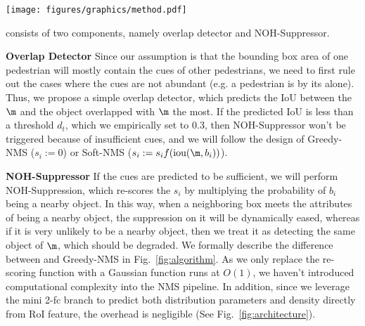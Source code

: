 \documentclass[sigconf]{acmart}
\begin{document}
\begin{figure*}[t]
\begin{center}
\texttt{[image: figures/graphics/method.pdf]}
\end{center}
\caption{\textbf{Architecture} {\normalfont The illustration of integrating \heatmapname{} (\heatmapnameshort{}) into the two-stage object detector, such as Faster-RCNN~\cite{faster-rcnn}. Note that our \heatmapnameshort{} can fit in single-stage object detectors as well by placing the \heatmapnameshort{} branch in parallel with the detection head. In this example, the lady at the front left is highly overlapped with the lady behind her, and our NOH pinpoints the location and shape of the lady behind so that the detection of her won't be mistakenly suppressed whereas other false positives will be eliminated.}}
\label{fig:architecture}
\end{figure*}
 \nmsname{} consists of two components, namely overlap detector and NOH-Suppressor. 

\textbf{Overlap Detector} Since our assumption is that the bounding box area of one pedestrian will mostly contain the cues of other pedestrians, we need to first rule out the cases where the cues are not abundant (e.g. a pedestrian is by its alone). Thus, we propose a simple overlap detector, which predicts the IoU between the $\m$ and the object overlapped with $\m$ the most. If the predicted IoU is less than a threshold $d_t$, which we empirically set to $0.3$, then NOH-Suppressor won't be triggered because of insufficient cues, and we will follow the design of Greedy-NMS ($s_i := 0$) or Soft-NMS ($s_i := s_if(\text{iou}(\m, b_i))$).

\textbf{NOH-Suppressor} If the cues are predicted to be sufficient, we will perform NOH-Suppression, which re-scores the $s_i$ by multiplying the probability of $b_i$ being a nearby object. In this way, when a neighboring box meets the attributes of being a nearby object, the suppression on it will be dynamically eased, whereas if it is very unlikely to be a nearby object, then we treat it as detecting the same object of $\m$, which should be degraded. We formally describe the difference between \nmsname{} and Greedy-NMS in Fig.~\ref{fig:algorithm}. As we only replace the re-scoring function with a Gaussian function runs at $O(1)$, we haven't introduced computational complexity into the NMS pipeline. In addition, since we leverage the mini 2-fc branch to predict both distribution parameters and density directly from RoI feature, the overhead is negligible (See Fig.~\ref{fig:architecture}).
\end{document}
